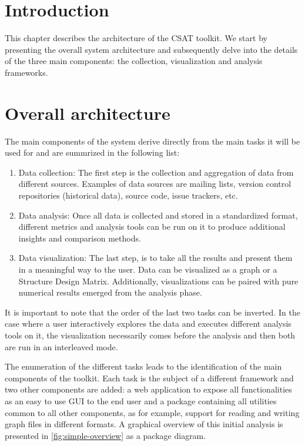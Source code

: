 



\section{Introduction}
\label{sec:design/intro}

This chapter describes the architecture of the CSAT toolkit. We start by presenting the overall system architecture and subsequently delve into the details of the three main components: the collection, visualization and analysis frameworks.


\section{Overall architecture}

The main components of the system derive directly from the main tasks it will be used for and are summrized in the following list:

\begin{enumerate}
    \item Data collection: The first step is the collection and aggregation of data from different sources. Examples of data sources are mailing lists, version control repositories (historical data), source code, issue trackers, etc.
    \item Data analysis: Once all data is collected and stored in a standardized format, different metrics and analysis tools can be run on it to produce additional insights and comparison methods.
    \item Data visualization: The last step, is to take all the results and present them in a meaningful way to the user. Data can be visualized as a graph or a Structure Design Matrix. Additionally, visualizations can be paired with pure numerical results emerged from the analysis phase.
\end{enumerate}

It is important to note that the order of the last two tasks can be inverted. In the case where a user interactively explores the data and executes different analysis tools on it, the visualization necessarily comes before the analysis and then both are run in an interleaved mode.

The enumeration of the different tasks leads to the identification of the main components of the toolkit. Each task is the subject of a different framework and two other components are added: a web application to expose all functionalities as an easy to use GUI to the end user and a package containing all utilities common to all other components, as for example, support for reading and writing graph files in different formats. A graphical overview of this initial analysis is presented in \vref{fig:simple-overview} as a package diagram.


